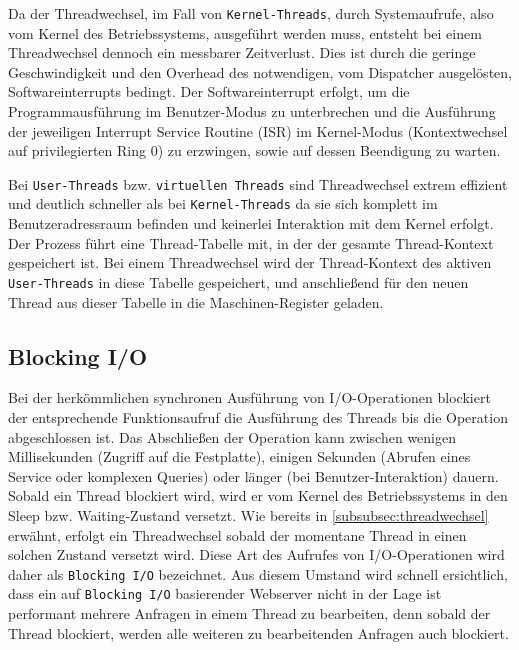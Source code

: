 \noindent
Da der Threadwechsel, im Fall von \verb|Kernel-Threads|, durch Systemaufrufe, also vom Kernel des Betriebssystems, ausgeführt werden muss, entsteht
bei einem Threadwechsel dennoch ein messbarer Zeitverlust.
Dies ist durch die geringe Geschwindigkeit und den Overhead des notwendigen, vom Dispatcher ausgelösten, Softwareinterrupts bedingt.
Der Softwareinterrupt erfolgt, um die Programmausführung im Benutzer-Modus zu unterbrechen und die Ausführung der jeweiligen Interrupt Service Routine (ISR) im
Kernel-Modus (Kontextwechsel auf privilegierten Ring 0) zu erzwingen, sowie auf dessen Beendigung zu warten.

Bei \verb|User-Threads| bzw. \verb|virtuellen Threads| sind Threadwechsel extrem effizient und deutlich schneller als bei \verb|Kernel-Threads|
da sie sich komplett im Benutzeradressraum befinden und keinerlei Interaktion mit dem Kernel erfolgt.
Der Prozess führt eine Thread-Tabelle mit, in der der gesamte Thread-Kontext gespeichert ist.
Bei einem Threadwechsel wird der Thread-Kontext des aktiven \verb|User-Threads| in diese Tabelle gespeichert, und anschließend für den neuen Thread
aus dieser Tabelle in die Maschinen-Register geladen.
\parencite[Kapitel 2.2.6 Thread Scheduling]{Tanenbaum2016}
\newpage
\subsection{Blocking I/O}
\label{subsec:blocking-i/o}
Bei der herkömmlichen synchronen Ausführung von I/O-Operationen blockiert der entsprechende Funktionsaufruf die Ausführung des
Threads bis die Operation abgeschlossen ist. Das Abschließen der Operation kann zwischen wenigen Millisekunden (Zugriff auf die Festplatte),
einigen Sekunden (Abrufen eines Service oder komplexen Queries) oder länger (bei Benutzer-Interaktion) dauern.
Sobald ein Thread blockiert wird, wird er vom Kernel des Betriebssystems in den Sleep bzw. Waiting-Zustand versetzt.
Wie bereits in \ref{subsubsec:threadwechsel} erwähnt, erfolgt ein Threadwechsel sobald der momentane Thread in einen solchen Zustand
versetzt wird.
Diese Art des Aufrufes von I/O-Operationen wird daher als \verb|Blocking I/O| bezeichnet.
Aus diesem Umstand wird schnell ersichtlich, dass ein auf \verb|Blocking I/O| basierender Webserver nicht in der Lage ist
performant mehrere Anfragen in einem Thread zu bearbeiten, denn sobald der Thread blockiert, werden alle weiteren zu bearbeitenden Anfragen
auch blockiert.
